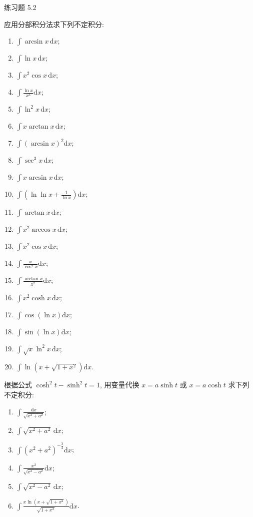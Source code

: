 \begin{exblock}{练习题 5.2}
  \item 应用分部积分法求下列不定积分:
  \begin{enumerate}[label=(\arabic*)]
    \item $\int\arcsin x\,\mathrm{d}x$;
    \item $\int\ln x\,\mathrm{d}x$;
    \item $\int x^{2}\cos x\,\mathrm{d}x$;
    \item $\int\frac{\ln x}{x^{3}}\mathrm{d}x$;
    \item $\int\ln^{2}x\,\mathrm{d}x$;
    \item $\int x\arctan x\,\mathrm{d}x$;
    \item $\int(\arcsin x)^{2}\mathrm{d}x$;
    \item $\int\sec^{3}x\,\mathrm{d}x$;
    \item $\int x\arcsin x\,\mathrm{d}x$;
    \item $\int\left(\ln\ln x+\frac{1}{\ln x}\right)\mathrm{d}x$;
    \item $\int\arctan x\,\mathrm{d}x$;
    \item $\int x^{2}\arccos x\,\mathrm{d}x$;
    \item $\int x^{2}\cos x\,\mathrm{d}x$;
    \item $\int\frac{x}{\cos^{2}x}\mathrm{d}x$;
    \item $\int\frac{\arctan x}{x^{2}}\mathrm{d}x$;
    \item $\int x^{2}\cosh x\,\mathrm{d}x$;
    \item $\int\cos(\ln x)\mathrm{d}x$;
    \item $\int\sin(\ln x)\mathrm{d}x$;
    \item $\int\sqrt{x}\ln^{2}x\,\mathrm{d}x$;
    \item $\int\ln(x+\sqrt{1+x^{2}})\mathrm{d}x$.
  \end{enumerate}

  \item 根据公式 $\cosh^{2}t-\sinh^{2}t=1$, 用变量代换 $x=a\sinh t$ 或 $x=a\cosh t$ 求下列不定积分:
  \begin{enumerate}[label=(\arabic*)]
    \item $\int\frac{\mathrm{d}x}{\sqrt{x^{2}+a^{2}}}$;
    \item $\int\sqrt{x^{2}+a^{2}}\,\mathrm{d}x$;
    \item $\int(x^{2}+a^{2})^{-\frac{3}{2}}\mathrm{d}x$;
    \item $\int\frac{x^{2}}{\sqrt{x^{2}-a^{2}}}\mathrm{d}x$;
    \item $\int\sqrt{x^{2}-a^{2}}\,\mathrm{d}x$;
    \item $\int\frac{x\ln(x+\sqrt{1+x^{2}})}{\sqrt{1+x^{2}}}\mathrm{d}x$.
  \end{enumerate}


\end{exblock}
